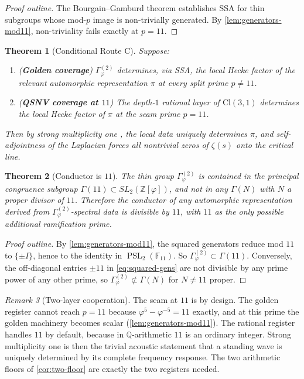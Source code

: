 \documentclass[11pt,a4paper]{article}
\theoremstyle{plain}
\newtheorem{theorem}{Theorem}[section]
\theoremstyle{definition}
\theoremstyle{remark}
\newtheorem{remark}[theorem]{Remark}
\numberwithin{equation}{section}
\providecommand{\Cl}{\mathrm{Cl}}
\providecommand{\Z}{\mathbb{Z}}
\providecommand{\Q}{\mathbb{Q}}
\providecommand{\F}{\mathbb{F}}
\providecommand{\vp}{\varphi}
\providecommand{\PSL}{\operatorname{PSL}}
\begin{document}
\begin{proof}[Proof outline]
The Bourgain--Gamburd theorem \cite{bourgain-gamburd2008}
establishes SSA for thin subgroups whose mod-$p$ image is
non-trivially generated.  By \cref{lem:generators-mod11},
non-triviality fails exactly at $p = 11$.
\end{proof}

\begin{theorem}[Conditional Route C]
\label{thm:route-c}
Suppose:
\begin{enumerate}
  \item (\textbf{Golden coverage}) $\Gamma_\vp^{(2)}$ determines,
    via SSA, the local Hecke factor of the relevant automorphic
    representation $\pi$ at every split prime $p \ne 11$.
  \item (\textbf{QSNV coverage at $11$}) The depth-$1$ rational
    layer of $\Cl(3,1)$ determines the local Hecke factor of $\pi$
    at the seam prime $p = 11$.
\end{enumerate}
Then by strong multiplicity one
\cite{jacquet-langlands1970}, the local data uniquely
determines $\pi$, and self-adjointness of the Laplacian forces
all nontrivial zeros of $\zeta(s)$ onto the critical line.
\end{theorem}

\begin{theorem}[Conductor is $11$]
\label{thm:conductor-11}
The thin group $\Gamma_\vp^{(2)}$ is contained in the principal
congruence subgroup $\Gamma(11) \subset SL_2(\Z[\vp])$, and not in
any $\Gamma(N)$ with $N$ a proper divisor of $11$.  Therefore the
conductor of any automorphic representation derived from
$\Gamma_\vp^{(2)}$-spectral data is divisible by $11$, with $11$
as the only possible additional ramification prime.
\end{theorem}

\begin{proof}[Proof outline]
By \cref{lem:generators-mod11}, the squared generators reduce mod
$11$ to $\{\pm I\}$, hence to the identity in $\PSL_2(\F_{11})$.
So $\Gamma_\vp^{(2)} \subset \Gamma(11)$.  Conversely, the
off-diagonal entries $\pm 11$ in \eqref{eq:squared-gens} are not
divisible by any prime power of any other prime, so
$\Gamma_\vp^{(2)} \not\subset \Gamma(N)$ for $N \ne 11$ proper.
\end{proof}

\begin{remark}[Two-layer cooperation]
\label{rmk:two-layer-cooperation}
The seam at $11$ is by design.  The golden register cannot reach
$p = 11$ because $\vp^5 - \vp^{-5} = 11$ exactly, and at this
prime the golden machinery becomes scalar
(\cref{lem:generators-mod11}).  The rational register handles $11$
by default, because in $\Q$-arithmetic $11$ is an ordinary
integer.  Strong multiplicity one is then the trivial acoustic
statement that a standing wave is uniquely determined by its
complete frequency response.  The two arithmetic floors of
\cref{cor:two-floor} are exactly the two registers needed.
\end{remark}
\end{document}

